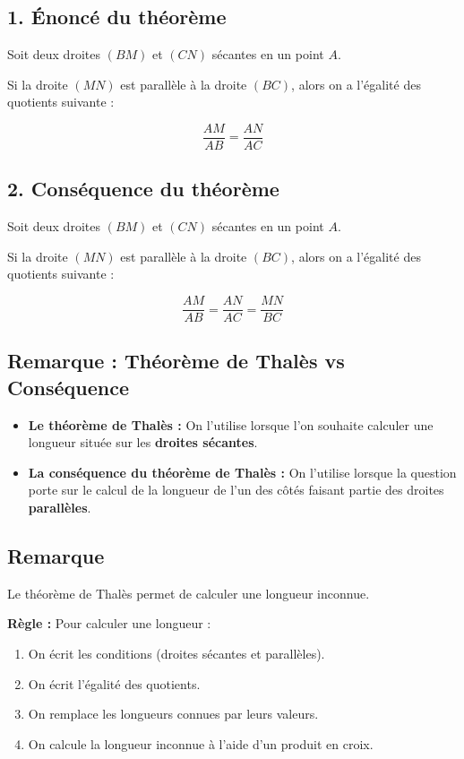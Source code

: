 \documentclass[12pt,a4paper]{article}
\begin{document}
\subsection*{\color{myred}1. Énoncé du théorème}
Soit deux droites $(BM)$ et $(CN)$ sécantes en un point $A$. 

Si la droite $(MN)$ est parallèle à la droite $(BC)$, alors on a l'égalité des quotients suivante :

$$\frac{AM}{AB} = \frac{AN}{AC}$$
\subsection*{\color{myred}2. Conséquence du théorème}
Soit deux droites $(BM)$ et $(CN)$ sécantes en un point $A$. 

Si la droite $(MN)$ est parallèle à la droite $(BC)$, alors on a l'égalité des quotients suivante :

$$\frac{AM}{AB} = \frac{AN}{AC} = \frac{MN}{BC}$$

\subsection*{\color{myred} Remarque : Théorème de Thalès vs Conséquence}

\begin{itemize}
    \item \textbf{Le théorème de Thalès :} On l'utilise lorsque l'on souhaite calculer une longueur située sur les \textbf{droites sécantes}.
    \item \textbf{La conséquence du théorème de Thalès :} On l'utilise lorsque la question porte sur le calcul de la longueur de l'un des côtés faisant partie des droites \textbf{parallèles}.
\end{itemize}
\subsection*{\color{myred} Remarque }
Le théorème de Thalès permet de calculer une longueur inconnue.

\textbf{Règle :}
Pour calculer une longueur :
\begin{enumerate}
    \item On écrit les conditions (droites sécantes et parallèles).
    \item On écrit l'égalité des quotients.
    \item On remplace les longueurs connues par leurs valeurs.
    \item On calcule la longueur inconnue à l'aide d'un produit en croix.
\end{enumerate}
\end{document}

